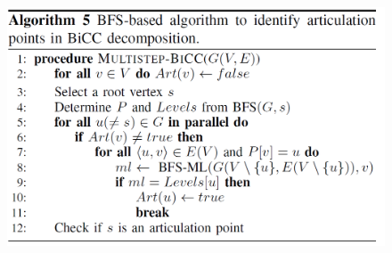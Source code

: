 \begin{frame}
	\begin{figure}
		\includegraphics[scale=0.25]{figure/fig-BBC-BFS-based.png}
	\end{figure}
\end{frame}